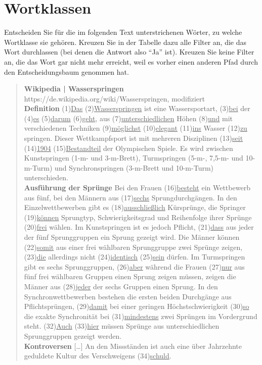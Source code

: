 \section{Wortklassen}\label{sec:bestimmen}

Entscheiden Sie für die im folgenden Text unterstrichenen Wörter, zu welche Wortklasse sie gehören.
Kreuzen Sie in der Tabelle dazu alle Filter an, die das Wort durchlassen (bei denen die Antwort also "`Ja"' ist).
Kreuzen Sie keine Filter an, die das Wort gar nicht mehr erreicht, weil es vorher einen anderen Pfad durch den Entscheidungsbaum genommen hat.

\begin{nohyphens}\begin{quote}
  \textbf{Wikipedia | Wasserspringen}\\
  https://de.wikipedia.org/wiki/Wasserspringen, modifiziert\\[0.5\baselineskip]
  \textbf{Definition}
  (1)\ul{Das} (2)\ul{Wasserspringen} ist eine Wassersportart, (3)\ul{bei} der (4)\ul{es} (5)\ul{darum} (6)\ul{geht}, aus (7)\ul{unterschiedlichen} Höhen (8)\ul{und} mit verschiedenen Techniken (9)\ul{möglichst} (10)\ul{elegant} (11)\ul{ins} Wasser (12)\ul{zu} springen.
  Dieser Wettkampfsport ist mit mehreren Disziplinen (13)\ul{seit} (14)\ul{1904} (15)\ul{Bestandteil} der Olympischen Spiele.
  Es wird zwischen Kunstspringen (1-m- und 3-m-Brett), Turmspringen (5-m-, 7,5-m- und 10-m-Turm) und Synchronspringen (3-m-Brett und 10-m-Turm) unterschieden.\\[0.5\baselineskip]
  \textbf{Ausführung der Sprünge}
  Bei den Frauen (16)\ul{besteht} ein Wettbewerb aus fünf, bei den Männern aus (17)\ul{sechs} Sprungdurchgängen.
  In den Einzelwettbewerben gibt es (18)\ul{ausschließlich} Kürsprünge, die Springer (19)\ul{können} Sprungtyp, Schwierigkeitsgrad und Reihenfolge ihrer Sprünge (20)\ul{frei} wählen.
  Im Kunstspringen ist es jedoch Pflicht, (21)\ul{dass} aus jeder der fünf Sprunggruppen ein Sprung gezeigt wird.
  Die Männer können (22)\ul{somit} aus einer frei wählbaren Sprunggruppe zwei Sprünge zeigen, (23)\ul{die} allerdings nicht (24)\ul{identisch} (25)\ul{sein} dürfen.
  Im Turmspringen gibt es sechs Sprunggruppen, (26)\ul{aber} während die Frauen (27)\ul{nur} aus fünf frei wählbaren Gruppen einen Sprung zeigen müssen, zeigen die Männer aus (28)\ul{jeder} der sechs Gruppen einen Sprung.
  In den Synchronwettbewerben bestehen die ersten beiden Durchgänge aus Pflichtsprüngen, (29)\ul{damit} bei einer geringen Höchstschwierigkeit (30)\ul{so} die exakte Synchronität bei (31)\ul{mindestens} zwei Sprüngen im Vordergrund steht.
  (32)\ul{Auch} (33)\ul{hier} müssen Sprünge aus unterschiedlichen Sprunggruppen gezeigt werden.\\[0.5\baselineskip]
  \textbf{Kontroversen} [\ldots] An den Missständen ist auch eine über Jahrzehnte geduldete Kultur des Verschweigens (34)\ul{schuld}.
\end{quote}\end{nohyphens}

